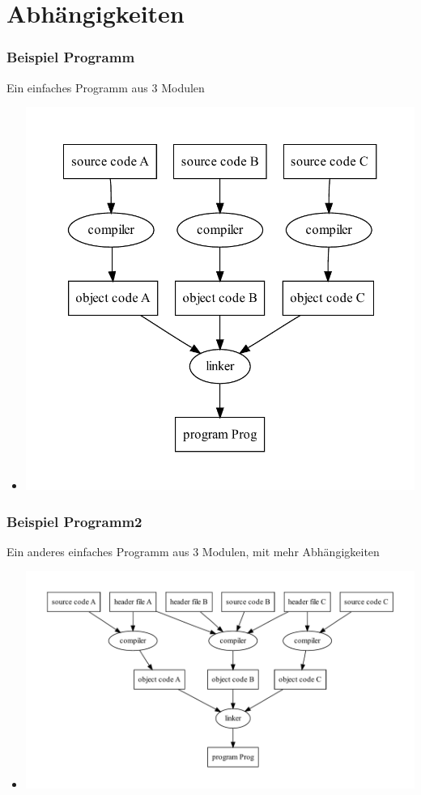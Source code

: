 \section{Abhängigkeiten}
\begin{frame}
	\frametitle{Beispiel Programm}
	Ein einfaches Programm aus 3 Modulen
    \begin{itemize}
      \item<2->[] \includegraphics[scale=0.5]{prog1.pdf}      
    \end{itemize}

\end{frame}

\begin{frame}
	\frametitle{Beispiel Programm2}
	Ein anderes einfaches Programm aus 3 Modulen, mit mehr Abhängigkeiten
    \begin{itemize}
      \item<2->[] \includegraphics[scale=0.41]{prog2.pdf}      
    \end{itemize}
\end{frame}

